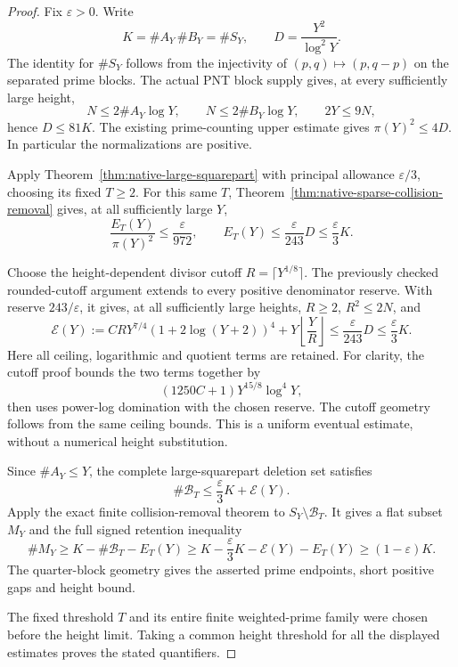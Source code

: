 \documentclass[11pt]{article}
\begin{document}
\begin{proof}
Fix \(\varepsilon>0\). Write
\[
 K=\#A_Y\,\#B_Y=\#S_Y,\qquad D=\frac{Y^2}{\log^2Y}.
\]
The identity for \(\#S_Y\) follows from the injectivity of
\((p,q)\mapsto(p,q-p)\) on the separated prime blocks.
The actual PNT block supply gives, at every sufficiently large
height,
\[
 N\le2\#A_Y\log Y,\qquad N\le2\#B_Y\log Y,
 \qquad 2Y\le9N,
\]
hence \(D\le81K\).
The existing prime-counting upper estimate gives
\(\pi(Y)^2\le4D\). In particular the normalizations are positive.

Apply Theorem~\ref{thm:native-large-squarepart} with principal
allowance \(\varepsilon/3\), choosing its fixed \(T\ge2\).
For this same \(T\), Theorem~\ref{thm:native-sparse-collision-removal}
gives, at all sufficiently large \(Y\),
\[
 \frac{E_T(Y)}{\pi(Y)^2}\le\frac{\varepsilon}{972},
 \qquad
 E_T(Y)\le\frac{\varepsilon}{243}D
          \le\frac{\varepsilon}{3}K.
\]

Choose the height-dependent divisor cutoff
\(R=\lceil Y^{1/8}\rceil\).
The previously checked rounded-cutoff argument extends to
every positive denominator reserve. With reserve
\(243/\varepsilon\), it gives, at all sufficiently large heights,
\(R\ge2\), \(R^2\le2N\), and
\[
 \mathcal E(Y):=
 CRY^{7/4}(1+2\log(Y+2))^4+
 Y\left\lfloor\frac YR\right\rfloor
 \le\frac{\varepsilon}{243}D
 \le\frac{\varepsilon}{3}K.
\]
Here all ceiling, logarithmic and quotient terms are retained.
For clarity, the cutoff proof bounds the two terms together by
\[
 (1250C+1)Y^{15/8}\log^4Y,
\]
then uses power-log domination with the chosen reserve.
The cutoff geometry follows from the same ceiling bounds.
This is a uniform eventual estimate, without a numerical
height substitution.

Since \(\#A_Y\le Y\), the complete large-squarepart deletion set
satisfies
\[
 \#\mathcal B_T\le\frac{\varepsilon}{3}K+\mathcal E(Y).
\]
Apply the exact finite collision-removal theorem to
\(S_Y\setminus\mathcal B_T\). It gives a flat subset \(M_Y\) and
the full signed retention inequality
\[
 \#M_Y\ge K-\#\mathcal B_T-E_T(Y)
 \ge K-\frac{\varepsilon}{3}K-\mathcal E(Y)-E_T(Y)
 \ge(1-\varepsilon)K.
\]
The quarter-block geometry gives the asserted prime endpoints,
short positive gaps and height bound.

The fixed threshold \(T\) and its entire finite weighted-prime
family were chosen before the height limit. Taking a common
height threshold for all the displayed estimates proves the
stated quantifiers.
\end{proof}
\end{document}
